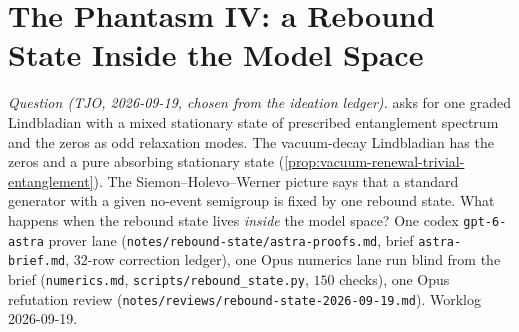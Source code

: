 
\section{The Phantasm IV: a Rebound State Inside the Model Space}
\label{sec:rebound-state}

\emph{Question (TJO, 2026-09-19, chosen from the ideation ledger).} 
asks for one graded Lindbladian with a mixed stationary state of prescribed entanglement spectrum and
the zeros as odd relaxation modes. The vacuum-decay Lindbladian has the zeros and a pure absorbing
stationary state (\cref{prop:vacuum-renewal-trivial-entanglement}). The Siemon--Holevo--Werner picture
\cite{siemon2017unbounded} says that a standard generator with a given no-event semigroup is fixed by
one rebound state. What happens when the rebound state lives \emph{inside} the model space? One codex
\texttt{gpt-6-astra} prover lane (\texttt{notes/rebound-state/astra-proofs.md}, brief
\texttt{astra-brief.md}, $32$-row correction ledger), one Opus numerics lane run blind from the brief
(\texttt{numerics.md}, \texttt{scripts/rebound\_state.py}, $150$ checks), one Opus refutation review
(\texttt{notes/reviews/rebound-state-2026-09-19.md}). Worklog 2026-09-19.

